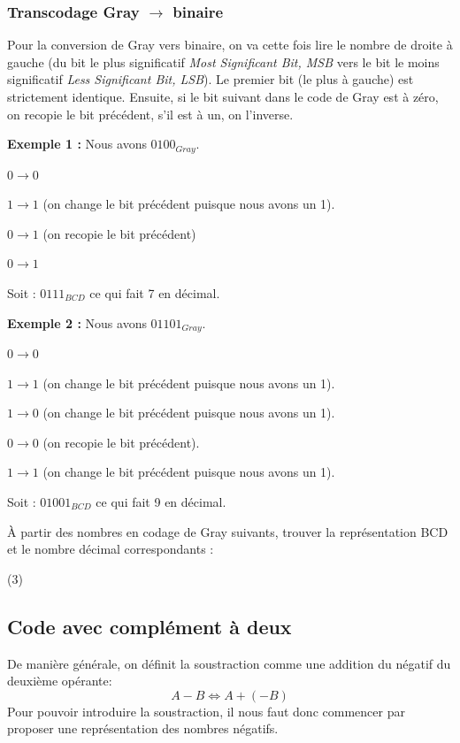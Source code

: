 \documentclass[a4paper,11pt]{book}
\theoremstyle{definition}
\begin{document}
\subsubsection{Transcodage Gray $\rightarrow$ binaire}
Pour la conversion de Gray vers binaire, on va cette fois lire le nombre de droite à gauche (du bit le plus significatif \textit{Most Significant Bit, MSB} vers le bit le moins significatif \textit{Less Significant Bit, LSB}).
Le premier bit (le plus à gauche) est strictement identique. Ensuite, si le bit suivant dans le code de Gray est à zéro, on recopie le bit précédent, s'il est à un, on l'inverse.

\textbf{Exemple 1 :} Nous avons $0100_{Gray}$. 

$0 \rightarrow 0$

$1 \rightarrow 1$ (on change le bit précédent puisque nous avons un 1).

$0 \rightarrow 1$ (on recopie le bit précédent)

$0 \rightarrow 1$

Soit : $0111_{BCD}$ ce qui fait 7 en décimal.

\textbf{Exemple 2 :} Nous avons $01101_{Gray}$. 

$0 \rightarrow 0$

$1 \rightarrow 1$ (on change le bit précédent puisque nous avons un 1).

$1 \rightarrow 0$ (on change le bit précédent puisque nous avons un 1).

$0 \rightarrow 0$ (on recopie le bit précédent).

$1 \rightarrow 1$ (on change le bit précédent puisque nous avons un 1).

Soit : $ 01001_{BCD}$ ce qui fait 9 en décimal.

\begin{exercise}
    À partir des nombres en codage de Gray suivants, trouver la représentation BCD et le nombre décimal correspondants :
    \begin{tasks}(3)
    \end{tasks}
\end{exercise}

\subsection{Code avec complément à deux}
De manière générale, on définit la soustraction comme une addition du négatif du deuxième opérante:
\[A -B \Leftrightarrow A + (-B)\]
Pour pouvoir introduire la soustraction, il nous faut donc commencer par proposer une représentation des nombres négatifs.
\end{document}
